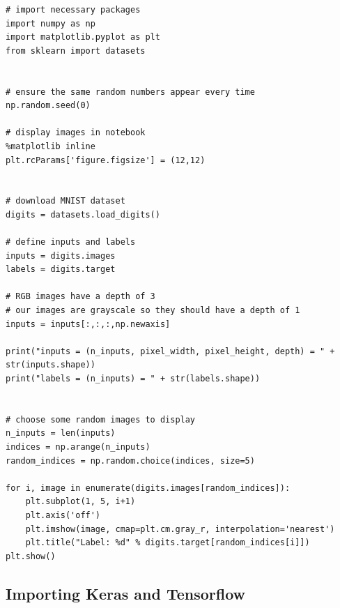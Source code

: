 \documentclass[%
oneside,                 %
final,                   %
10pt]{article}
\begin{document}
\begin{verbatim}
# import necessary packages
import numpy as np
import matplotlib.pyplot as plt
from sklearn import datasets


# ensure the same random numbers appear every time
np.random.seed(0)

# display images in notebook
%matplotlib inline
plt.rcParams['figure.figsize'] = (12,12)


# download MNIST dataset
digits = datasets.load_digits()

# define inputs and labels
inputs = digits.images
labels = digits.target

# RGB images have a depth of 3
# our images are grayscale so they should have a depth of 1
inputs = inputs[:,:,:,np.newaxis]

print("inputs = (n_inputs, pixel_width, pixel_height, depth) = " + str(inputs.shape))
print("labels = (n_inputs) = " + str(labels.shape))


# choose some random images to display
n_inputs = len(inputs)
indices = np.arange(n_inputs)
random_indices = np.random.choice(indices, size=5)

for i, image in enumerate(digits.images[random_indices]):
    plt.subplot(1, 5, i+1)
    plt.axis('off')
    plt.imshow(image, cmap=plt.cm.gray_r, interpolation='nearest')
    plt.title("Label: %d" % digits.target[random_indices[i]])
plt.show()

\end{verbatim}


\subsection{Importing Keras and Tensorflow}
\end{document}
